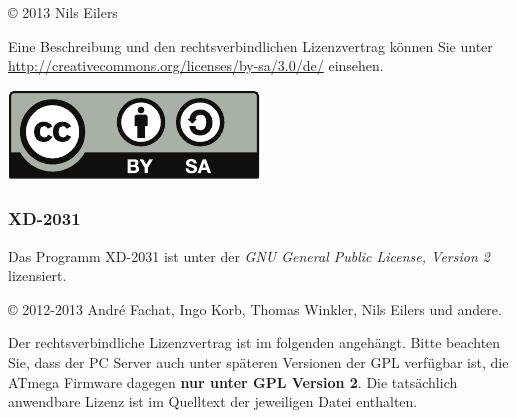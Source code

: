 \documentclass[10pt,a4paper]{scrartcl}		%
\begin{document}
\copyright{} 2013 Nils Eilers

Eine Beschreibung und den rechtsverbindlichen Lizenzvertrag
können Sie unter \url{http://creativecommons.org/licenses/by-sa/3.0/de/}
einsehen.

\includegraphics[scale=1]{by-sa.pdf}

\subsubsection{XD-2031}
Das Programm \glqq{}XD-2031\grqq{} ist unter der
\textit{GNU General Public License, Version 2} lizensiert.

\copyright{} 2012-2013 André Fachat, Ingo Korb, Thomas Winkler,
Nils Eilers und andere.

Der rechtsverbindliche Lizenzvertrag ist im folgenden angehängt.
Bitte beachten Sie, dass der PC Server auch unter späteren
Versionen der GPL verfügbar ist, die ATmega Firmware dagegen
\textbf{nur unter GPL Version 2}. Die tatsächlich anwendbare
Lizenz ist im Quelltext der jeweiligen Datei enthalten.




\printindex
\end{document}
